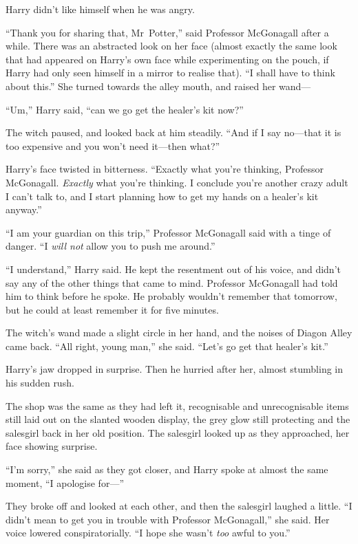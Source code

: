 Harry didn’t like himself when he was angry.

“Thank you for sharing that, Mr~Potter,” said Professor McGonagall after a while. There was an abstracted look on her face (almost exactly the same look that had appeared on Harry’s own face while experimenting on the pouch, if Harry had only seen himself in a mirror to realise that). “I shall have to think about this.” She turned towards the alley mouth, and raised her wand—

“Um,” Harry said, “can we go get the healer’s kit now?”

The witch paused, and looked back at him steadily. “And if I say no—that it is too expensive and you won’t need it—then what?”

Harry’s face twisted in bitterness. “Exactly what you’re thinking, Professor McGonagall. \emph{Exactly} what you’re thinking. I conclude you’re another crazy adult I can’t talk to, and I start planning how to get my hands on a healer’s kit anyway.”

“I am your guardian on this trip,” Professor McGonagall said with a tinge of danger. “I \emph{will not} allow you to push me around.”

“I understand,” Harry said. He kept the resentment out of his voice, and didn’t say any of the other things that came to mind. Professor McGonagall had told him to think before he spoke. He probably wouldn’t remember that tomorrow, but he could at least remember it for five minutes.

The witch’s wand made a slight circle in her hand, and the noises of Diagon Alley came back. “All right, young man,” she said. “Let’s go get that healer’s kit.”

Harry’s jaw dropped in surprise. Then he hurried after her, almost stumbling in his sudden rush.

\later

The shop was the same as they had left it, recognisable and unrecognisable items still laid out on the slanted wooden display, the grey glow still protecting and the salesgirl back in her old position. The salesgirl looked up as they approached, her face showing surprise.

“I’m sorry,” she said as they got closer, and Harry spoke at almost the same moment, “I apologise for—”

They broke off and looked at each other, and then the salesgirl laughed a little. “I didn’t mean to get you in trouble with Professor McGonagall,” she said. Her voice lowered conspiratorially. “I hope she wasn’t \emph{too} awful to you.”


